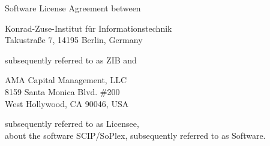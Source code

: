 \documentclass[12pt,a4paper]{article}
\date{October 24th, 2007}
\begin{document}


Software License Agreement between
\begin{center}
  Konrad-Zuse-Institut f\"ur Informationstechnik\\
  Takustra\ss{}e 7, 14195 Berlin, Germany\\
\end{center}
subsequently referred to as ZIB and
\begin{center}
  AMA Capital Management, LLC\\
  8159 Santa Monica Blvd. \#200\\
  West Hollywood, CA 90046, USA\\
\end{center}
subsequently referred to as Licensee,\\
about the software SCIP/SoPlex, subsequently referred to as Software.
\end{document}
